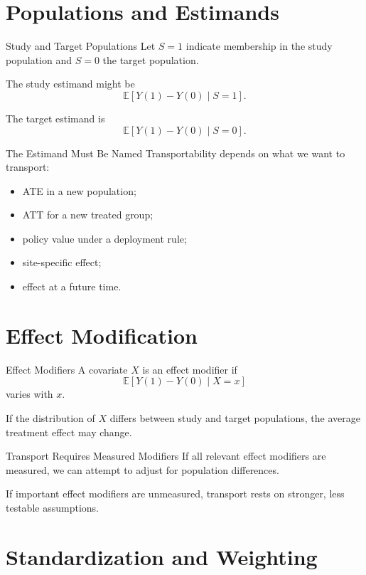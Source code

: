 \documentclass[aspectratio=169,11pt]{beamer}
\newcommand{\E}{\mathbb{E}}
\begin{document}
\section{Populations and Estimands}

\begin{frame}{Study and Target Populations}
Let \(S=1\) indicate membership in the study population and \(S=0\) the target population.

The study estimand might be
\[
\E[Y(1)-Y(0)\mid S=1].
\]

The target estimand is
\[
\E[Y(1)-Y(0)\mid S=0].
\]
\end{frame}

\begin{frame}{The Estimand Must Be Named}
Transportability depends on what we want to transport:
\begin{itemize}
\item ATE in a new population;
\item ATT for a new treated group;
\item policy value under a deployment rule;
\item site-specific effect;
\item effect at a future time.
\end{itemize}
\end{frame}

\section{Effect Modification}

\begin{frame}{Effect Modifiers}
A covariate \(X\) is an effect modifier if
\[
\E[Y(1)-Y(0)\mid X=x]
\]
varies with \(x\).

If the distribution of \(X\) differs between study and target populations, the average treatment effect may change.
\end{frame}

\begin{frame}{Transport Requires Measured Modifiers}
If all relevant effect modifiers are measured, we can attempt to adjust for population differences.

If important effect modifiers are unmeasured, transport rests on stronger, less testable assumptions.
\end{frame}

\section{Standardization and Weighting}
\end{document}
